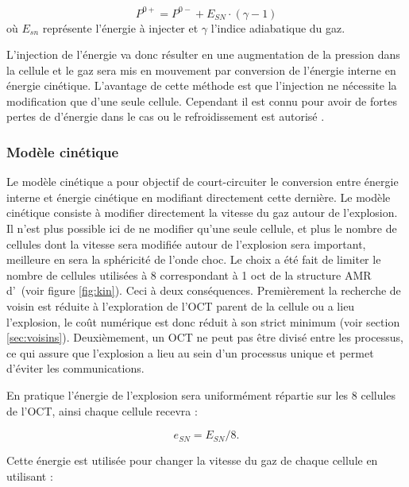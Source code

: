 \begin{equation}
P^{0+} = P^{0-}  + E_{SN} \cdot  (\gamma-1)
\end{equation}
où $E_{sn}$ représente l'énergie à injecter et $\gamma$ l'indice adiabatique du gaz.

L'injection de l'énergie va donc résulter en une augmentation de la pression dans la cellule et le gaz sera mis en mouvement par conversion de l'énergie interne en énergie cinétique. 
L'avantage de cette méthode est que l'injection ne nécessite la modification que d'une seule cellule.
Cependant il est connu pour avoir de fortes pertes de d'énergie dans le cas ou le refroidissement est autorisé \citep{navarro_simulations_1993}. 

\subsubsection{Modèle cinétique}

Le modèle cinétique a pour objectif de court-circuiter le conversion entre énergie interne et énergie cinétique en modifiant directement cette dernière.
Le modèle cinétique consiste à modifier directement la vitesse du gaz autour de l'explosion.%
Il n'est plus possible ici de ne modifier qu'une seule cellule, et plus le nombre de cellules dont la vitesse sera modifiée autour de l'explosion sera important, meilleure en sera la sphéricité de l'onde choc.
Le choix a été fait de limiter le nombre de cellules utilisées à 8 correspondant à 1 oct de la structure \ac{AMR} d'\emma\ (voir figure \ref{fig:kin}).
Ceci à deux conséquences.
Premièrement la recherche de voisin est réduite à l'exploration de l'OCT parent de la cellule ou a lieu l'explosion, le coût numérique est donc réduit à son strict minimum (voir section \ref{sec:voisins}).
Deuxièmement, un OCT ne peut pas être divisé entre les processus, ce qui assure que l'explosion a lieu au sein d'un processus unique et permet d'éviter les communications.

En pratique l'énergie de l'explosion sera uniformément répartie sur les 8 cellules de l'OCT, ainsi chaque cellule recevra : 

\begin{equation}
e_{SN} = E_{SN}/8.
\end{equation}

Cette énergie est utilisée pour changer la vitesse du gaz de chaque cellule en utilisant : 

